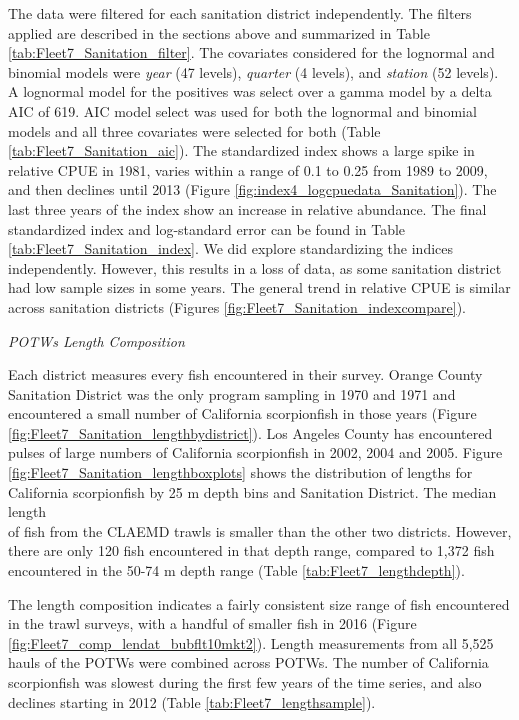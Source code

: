 \documentclass[12pt,]{article}
\begin{document}
The data were filtered for each sanitation district independently. The
filters applied are described in the sections above and summarized in
Table \ref{tab:Fleet7_Sanitation_filter}. The covariates considered for
the lognormal and binomial models were \emph{year} (47 levels),
\emph{quarter} (4 levels), and \emph{station} (52 levels). A lognormal
model for the positives was select over a gamma model by a delta AIC of
619. AIC model select was used for both the lognormal and binomial
models and all three covariates were selected for both (Table
\ref{tab:Fleet7_Sanitation_aic}). The standardized index shows a large
spike in relative CPUE in 1981, varies within a range of 0.1 to 0.25
from 1989 to 2009, and then declines until 2013 (Figure
\ref{fig:index4_logcpuedata_Sanitation}). The last three years of the
index show an increase in relative abundance. The final standardized
index and log-standard error can be found in Table
\ref{tab:Fleet7_Sanitation_index}. We did explore standardizing the
indices independently. However, this results in a loss of data, as some
sanitation district had low sample sizes in some years. The general
trend in relative CPUE is similar across sanitation districts (Figures
\ref{fig:Fleet7_Sanitation_indexcompare}).

\emph{POTWs Length Composition}

Each district measures every fish encountered in their survey. Orange
County Sanitation District was the only program sampling in 1970 and
1971 and encountered a small number of California scorpionfish in those
years (Figure \ref{fig:Fleet7_Sanitation_lengthbydistrict}). Los Angeles
County has encountered pulses of large numbers of California
scorpionfish in 2002, 2004 and 2005. Figure
\ref{fig:Fleet7_Sanitation_lengthboxplots} shows the distribution of
lengths for California scorpionfish by 25 m depth bins and Sanitation
District. The median length\\
of fish from the CLAEMD trawls is smaller than the other two districts.
However, there are only 120 fish encountered in that depth range,
compared to 1,372 fish encountered in the 50-74 m depth range (Table
\ref{tab:Fleet7_lengthdepth}).

The length composition indicates a fairly consistent size range of fish
encountered in the trawl surveys, with a handful of smaller fish in 2016
(Figure \ref{fig:Fleet7_comp_lendat_bubflt10mkt2}). Length measurements
from all 5,525 hauls of the POTWs were combined across POTWs. The number
of California scorpionfish was slowest during the first few years of the
time series, and also declines starting in 2012 (Table
\ref{tab:Fleet7_lengthsample}).
\end{document}
